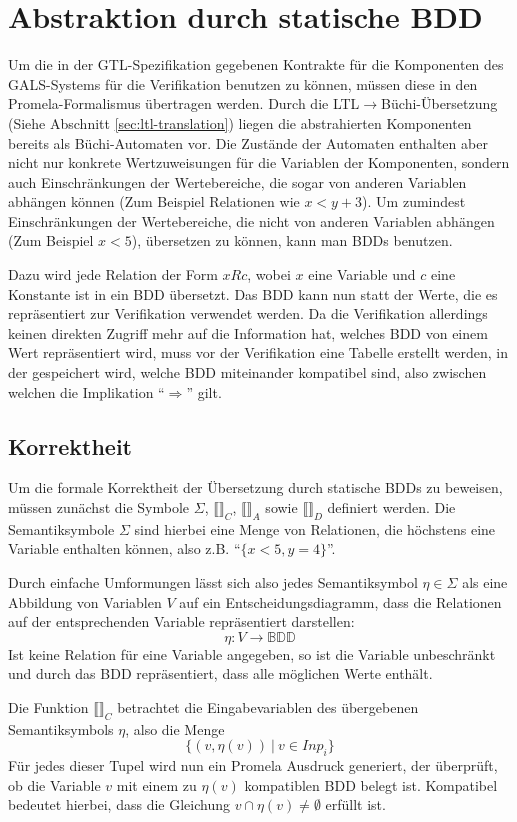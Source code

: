 \section{Abstraktion durch statische BDD}
Um die in der GTL-Spezifikation gegebenen Kontrakte für die Komponenten des GALS-Systems für die Verifikation benutzen zu können, müssen diese in den Promela-Formalismus übertragen werden.
Durch die LTL$\rightarrow$Büchi-Übersetzung (Siehe Abschnitt \ref{sec:ltl-translation}) liegen die abstrahierten Komponenten bereits als Büchi-Automaten vor.
Die Zustände der Automaten enthalten aber nicht nur konkrete Wertzuweisungen für die Variablen der Komponenten, sondern auch Einschränkungen der Wertebereiche, die sogar von anderen Variablen abhängen können (Zum Beispiel Relationen wie $x < y + 3$).
Um zumindest Einschränkungen der Wertebereiche, die nicht von anderen Variablen abhängen (Zum Beispiel $x < 5$), übersetzen zu können, kann man BDDs benutzen.

Dazu wird jede Relation der Form $x R c$, wobei $x$ eine Variable und $c$ eine Konstante ist in ein BDD übersetzt.
Das BDD kann nun statt der Werte, die es repräsentiert zur Verifikation verwendet werden.
Da die Verifikation allerdings keinen direkten Zugriff mehr auf die Information hat, welches BDD von einem Wert repräsentiert wird, muss vor der Verifikation eine Tabelle erstellt werden, in der gespeichert wird, welche BDD miteinander kompatibel sind, also zwischen welchen die Implikation "`$\Rightarrow$"' gilt.
\subsection{Korrektheit}
Um die formale Korrektheit der Übersetzung durch statische BDDs zu beweisen, müssen zunächst die Symbole $\Sigma$, $\llbracket\rrbracket_C$, $\llbracket\rrbracket_A$ sowie $\llbracket\rrbracket_D$ definiert werden.
Die Semantiksymbole $\Sigma$ sind hierbei eine Menge von Relationen, die höchstens eine Variable enthalten können, also z.B. "`$\{x<5,y=4\}$"'.

Durch einfache Umformungen lässt sich also jedes Semantiksymbol $\eta\in\Sigma$ als eine Abbildung von Variablen $V$ auf ein Entscheidungsdiagramm, dass die Relationen auf der entsprechenden Variable repräsentiert darstellen:
\[ \eta : V\rightarrow \mathbb{BDD} \]
Ist keine Relation für eine Variable angegeben, so ist die Variable unbeschränkt und durch das BDD repräsentiert, dass alle möglichen Werte enthält.

Die Funktion $\llbracket\rrbracket_C$ betrachtet die Eingabevariablen des übergebenen Semantiksymbols $\eta$, also die Menge
\[ \{ (v,\eta(v))\ |\ v\in \mathit{Inp}_i \} \]
Für jedes dieser Tupel wird nun ein Promela Ausdruck generiert, der überprüft, ob die Variable $v$ mit einem zu $\eta(v)$ kompatiblen BDD belegt ist.
Kompatibel bedeutet hierbei, dass die Gleichung $v\cap\eta(v)\neq \emptyset$ erfüllt ist.

